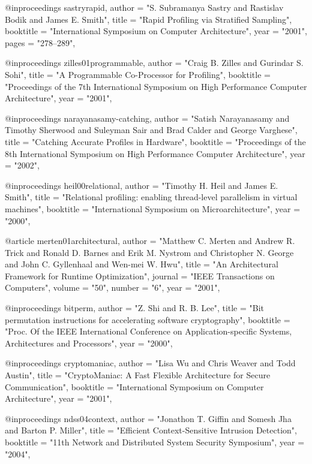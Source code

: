 @inproceedings{ sastryrapid,
    author = "S. Subramanya Sastry and Rastislav Bodik and James E. Smith",
    title = "Rapid Profiling via Stratified Sampling",
    booktitle = "International Symposium on Computer Architecture",
    year = "2001",
    pages = "278--289",
}

@inproceedings{ zilles01programmable,
    author = "Craig B. Zilles and Gurindar S. Sohi",
    title = "A Programmable Co-Processor for Profiling",
    booktitle = "Proceedings of the 7th International Symposium on High Performance Computer Architecture",
    year = "2001",
}

@inproceedings{ narayanasamy-catching,
  author = "Satish Narayanasamy and Timothy Sherwood and Suleyman Sair and Brad Calder
    and George Varghese",
  title = "Catching Accurate Profiles in Hardware",
    booktitle = "Proceedings of the 8th International Symposium on High Performance Computer Architecture",
    year = "2002",
}

@inproceedings{ heil00relational,
    author = "Timothy H. Heil and James E. Smith",
    title = "Relational profiling: enabling thread-level parallelism in virtual machines",
    booktitle = "International Symposium on Microarchitecture",
    year = "2000",
}

@article{ merten01architectural,
    author = "Matthew C. Merten and Andrew R. Trick and Ronald D. Barnes and Erik M. Nystrom and Christopher N. George and John C. Gyllenhaal and Wen-mei W. Hwu",
    title = "An Architectural Framework for Runtime Optimization",
    journal = "IEEE Transactions on Computers",
    volume = "50",
    number = "6",
    year = "2001",
}

@inproceedings{ bitperm,
    author = "Z. Shi and R. B. Lee",
    title = "Bit permutation instructions for accelerating software cryptography",
    booktitle = "Proc. Of the IEEE International Conference on Application-specific Systems, Architectures and Processors",
    year = "2000",
}

@inproceedings{ cryptomaniac,
    author = "Lisa Wu and Chris Weaver and Todd Austin",
    title = "CryptoManiac: A Fast Flexible Architecture for Secure Communication",
    booktitle = "International Symposium on Computer Architecture",
    year = "2001",
}

@inproceedings{ ndss04context,
	author = "Jonathon T. Giffin and Somesh Jha and Barton P. Miller",
	title = "Efficient Context-Sensitive Intrusion Detection",
	booktitle = "11th Network and Distributed System Security Symposium",
	year = "2004",
}

